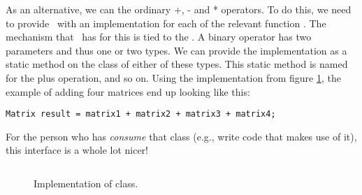 As an alternative, we can  the ordinary +, - and * operators. To do this, we need to provide \csharp\ with an implementation for each of the relevant function . The mechanism that \csharp\ has for this is tied to the . A binary operator has two parameters and thus one or two types. We can provide the implementation as a static method on the class of either of these types. This static method is named  for the plus operation, and so on. Using the implementation from figure \ref{fig:objects:matrix:lib}, the example of adding four matrices end up looking like this:
\begin{verbatim}
Matrix result = matrix1 + matrix2 + matrix3 + matrix4;
\end{verbatim}
For the person who has \textsl{consume} that class (e.g., write code that makes use of it), this interface is a whole lot nicer!

\begin{figure}[tbp]
  \inputminted[fontsize=\footnotesize]{csharp}{../src/csharp/matrix/Matrix.cs}
  \caption{Implementation of  class.}
  \label{fig:objects:matrix:lib}
\end{figure}



